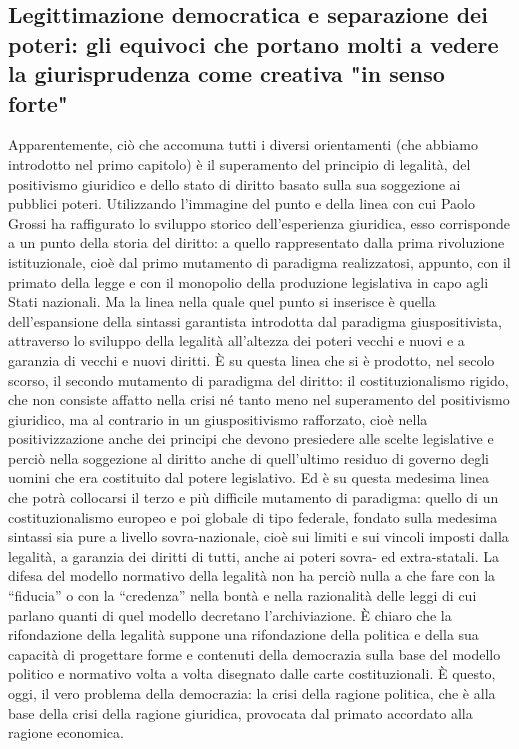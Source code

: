 \subsection{Legittimazione democratica e separazione dei poteri: gli equivoci che portano molti a vedere la giurisprudenza come creativa "in senso forte"}
Apparentemente, ciò che accomuna tutti i diversi orientamenti (che abbiamo introdotto nel primo capitolo) è il superamento del principio di legalità, del positivismo giuridico e dello stato di diritto basato sulla sua soggezione ai pubblici poteri.
Utilizzando l’immagine del punto e della linea con cui Paolo Grossi ha raffigurato lo sviluppo storico dell’esperienza giuridica, esso corrisponde a un punto della storia del diritto: a quello rappresentato dalla prima rivoluzione istituzionale, cioè dal primo mutamento di paradigma realizzatosi, appunto, con il primato della legge e con il monopolio della produzione legislativa in capo agli Stati nazionali. Ma la linea nella quale quel punto si inserisce è quella dell’espansione della sintassi garantista introdotta dal paradigma giuspositivista, attraverso lo sviluppo della legalità all’altezza dei poteri vecchi e nuovi e a garanzia di vecchi e nuovi diritti. È su questa linea che si è prodotto, nel secolo scorso, il secondo mutamento di paradigma del diritto: il costituzionalismo rigido, che non consiste affatto nella crisi né tanto meno nel superamento del positivismo giuridico, ma al contrario in un giuspositivismo rafforzato, cioè nella positivizzazione anche dei principi che devono presiedere alle scelte legislative e perciò nella soggezione al diritto anche di quell’ultimo residuo di governo degli uomini che era costituito dal potere legislativo. Ed è su questa medesima linea che potrà collocarsi il terzo e più difficile mutamento di paradigma: quello di un costituzionalismo europeo e poi globale di tipo federale, fondato sulla medesima sintassi sia pure a livello sovra-nazionale, cioè sui limiti e sui vincoli imposti dalla legalità, a garanzia dei diritti di tutti, anche ai poteri sovra- ed extra-statali.
La difesa del modello normativo della legalità non ha perciò nulla a che fare con la “fiducia” o con la “credenza” nella bontà e nella razionalità delle leggi di cui parlano quanti di quel modello decretano l’archiviazione. È chiaro che la rifondazione della legalità suppone una rifondazione della politica e della sua capacità di progettare forme e contenuti della democrazia sulla base del modello politico e normativo volta a volta disegnato dalle carte costituzionali. È questo, oggi, il vero problema della democrazia: la crisi della ragione politica, che è alla base della crisi della ragione giuridica, provocata dal primato accordato alla ragione economica. 
